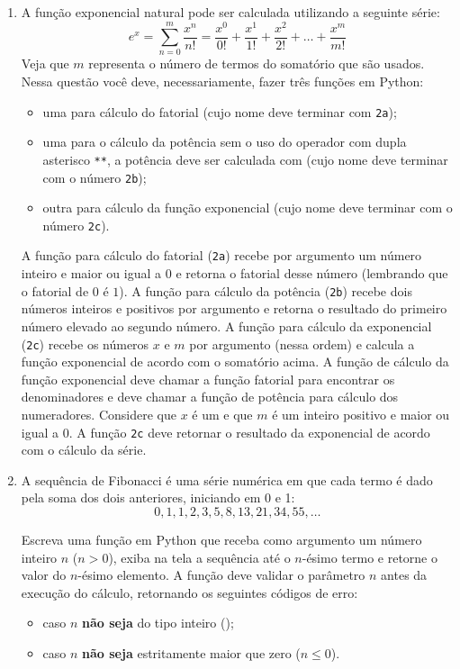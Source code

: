 \begin{enumerate}[label=\textbf{Q\arabic*.}]
    \item A função exponencial natural pode ser calculada utilizando a seguinte série:
    \[
    e^{x} = \sum_{n=0}^{m} \frac{x^{n}}{n!} = \frac{x^{0}}{0!} + \frac{x^{1}}{1!} + \frac{x^{2}}{2!} + \dots + \frac{x^{m}}{m!}
    \]
    Veja que $m$ representa o número de termos do somatório que são usados. Nessa questão você deve, necessariamente, fazer três funções em Python:
    \begin{itemize}
        \item uma para cálculo do fatorial (cujo nome deve terminar com \texttt{2a});
        \item uma para o cálculo da potência sem o uso do operador com dupla asterisco \texttt{**}, a potência deve ser calculada com  (cujo nome deve terminar com o número \texttt{2b});
        \item outra para cálculo da função exponencial (cujo nome deve terminar com o número \texttt{2c}).
    \end{itemize}
    A função para cálculo do fatorial (\texttt{2a}) recebe por argumento um número inteiro e maior ou igual a $0$ e retorna o fatorial desse número (lembrando que o fatorial de $0$ é $1$). A função para cálculo da potência (\texttt{2b}) recebe dois números inteiros e positivos por argumento e retorna o resultado do primeiro número elevado ao segundo número. A função para cálculo da exponencial (\texttt{2c}) recebe os números $x$ e $m$ por argumento (nessa ordem) e calcula a função exponencial de acordo com o somatório acima. A função de cálculo da função exponencial deve chamar a função fatorial para encontrar os denominadores e deve chamar a função de potência para cálculo dos numeradores. Considere que $x$ é um  e que $m$ é um inteiro positivo e maior ou igual a $0$. A função \texttt{2c} deve retornar o resultado da exponencial de acordo com o cálculo da série.

    

    \vspace{0.5cm}
    \item A sequência de Fibonacci é uma série numérica em que cada termo é dado pela soma dos dois anteriores, iniciando em 0 e 1:
    \[
    0, 1, 1, 2, 3, 5, 8, 13, 21, 34, 55, \dots
    \]

    \noindent Escreva uma função em Python que receba como argumento um número inteiro $n$ ($n > 0$), exiba na tela a sequência até o $n$-ésimo termo e retorne o valor do $n$-ésimo elemento. A função deve validar o parâmetro $n$ antes da execução do cálculo, retornando os seguintes códigos de erro:
    \begin{itemize}
    \item {} caso $n$ \textbf{não seja} do tipo inteiro ();
    \item {} caso $n$ \textbf{não seja} estritamente maior que zero ($n \le 0$).
    \end{itemize}


\end{enumerate}
